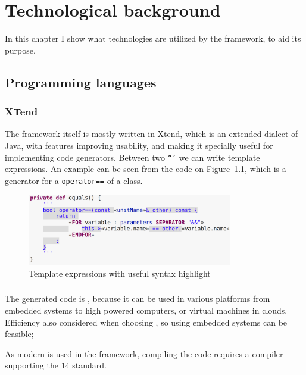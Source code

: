 \chapter{Technological background}

In this chapter I show what technologies are utilized by the framework, to aid its purpose.

\section{Programming languages}


\subsection{XTend}
The framework itself is mostly written in Xtend, which is an extended dialect of Java, with features improving usability, and making it specially useful for implementing code generators. 
Between two \texttt{'''} we can write template expressions.
An example can be seen from the code on Figure~\ref{fig:xtend}, which is a generator for a \cpp{} \texttt{operator==} of a class. 

\begin{figure}[H]
	\begin{center}
		\includegraphics[width=0.8\textwidth]{figures/xtend.png}
		\caption{Template expressions with useful syntax highlight }
		\label{fig:xtend}
	\end{center}
\end{figure}


\subsection{\protect\cpp }
The generated code is \cpp{}, because it can be used in various platforms from embedded systems to high powered computers, or virtual machines in clouds. 
Efficiency also considered when choosing \cpp{}, so using embedded systems can be feasible; 

As modern \cpp{} is used in the framework, compiling the code requires a compiler supporting the \cpp{}14 standard. 


